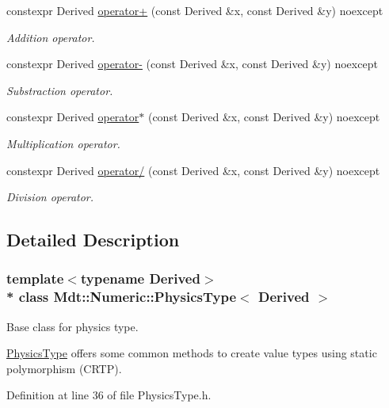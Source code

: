 \begin{DoxyCompactItemize}
constexpr Derived \hyperlink{class_mdt_1_1_numeric_1_1_physics_type_ab6f62fa67f9f960a1be4bad528f4deaa}{operator+} (const Derived \&x, const Derived \&y) noexcept
\begin{DoxyCompactList}\small\item\em Addition operator. \end{DoxyCompactList}\item 
constexpr Derived \hyperlink{class_mdt_1_1_numeric_1_1_physics_type_a3f8c0bf444b41a8b3a2d974577d79d33}{operator-\/} (const Derived \&x, const Derived \&y) noexcept
\begin{DoxyCompactList}\small\item\em Substraction operator. \end{DoxyCompactList}\item 
constexpr Derived \hyperlink{class_mdt_1_1_numeric_1_1_physics_type_af5cf67aa0a0834c55a9507898d457b26}{operator$\ast$} (const Derived \&x, const Derived \&y) noexcept
\begin{DoxyCompactList}\small\item\em Multiplication operator. \end{DoxyCompactList}\item 
constexpr Derived \hyperlink{class_mdt_1_1_numeric_1_1_physics_type_a21498867f825277834543bf7e08ecc27}{operator/} (const Derived \&x, const Derived \&y) noexcept
\begin{DoxyCompactList}\small\item\em Division operator. \end{DoxyCompactList}\end{DoxyCompactItemize}


\subsection{Detailed Description}
\subsubsection*{template$<$typename Derived$>$\\*
class Mdt\+::\+Numeric\+::\+Physics\+Type$<$ Derived $>$}

Base class for physics type. 

\hyperlink{class_mdt_1_1_numeric_1_1_physics_type}{Physics\+Type} offers some common methods to create value types using static polymorphism (C\+R\+TP). 

Definition at line 36 of file Physics\+Type.\+h.




